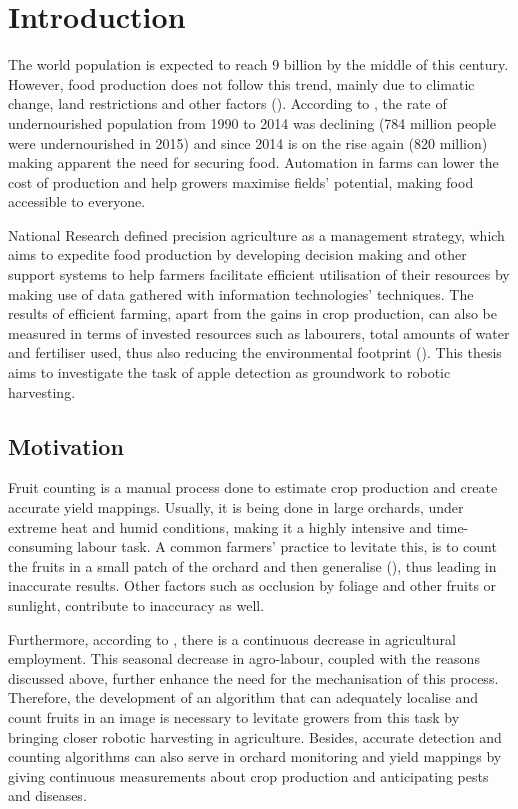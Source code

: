 \chapter{Introduction} \label{Chapter:Introduction}
The world population is expected to reach 9 billion by the middle of this century. However, food production does not follow this trend, mainly due to climatic change, land restrictions and other factors (\cite{godfray2010food}). According to \cite{mcguire2015fao}, the rate of undernourished population from 1990 to 2014 was declining (784 million people were undernourished in 2015) and since 2014 is on the rise again (820 million) making apparent the need for securing food. Automation in farms can lower the cost of production and help growers maximise fields' potential, making food accessible to everyone.

National Research \cite{NAP5491} defined precision agriculture as a management strategy, which aims to expedite food production by developing decision making and other support systems to help farmers facilitate efficient utilisation of their resources by making use of data gathered with information technologies' techniques. The results of efficient farming, apart from the gains in crop production, can also be measured in terms of invested resources such as labourers, total amounts of water and fertiliser used, thus also reducing the environmental footprint (\cite{zhang2012application}). This thesis aims to investigate the task of apple detection as groundwork to robotic harvesting.

\section{Motivation}
Fruit counting is a manual process done to estimate crop production and create accurate yield mappings. Usually, it is being done in large orchards, under extreme heat and humid conditions, making it a highly intensive and time-consuming labour task. A common farmers' practice to levitate this, is to count the fruits in a small patch of the orchard and then generalise (\cite{bargoti2017fruit}), thus leading in inaccurate results. Other factors such as occlusion by foliage and other fruits or sunlight, contribute to inaccuracy as well.

Furthermore, according to \cite{agro_employment}, there is a continuous decrease in agricultural employment. This seasonal decrease in agro-labour, coupled with the reasons discussed above, further enhance the need for the mechanisation of this process. Therefore, the development of an algorithm that can adequately localise and count fruits in an image is necessary to levitate growers from this task by bringing closer robotic harvesting in agriculture. Besides, accurate detection and counting algorithms can also serve in orchard monitoring and yield mappings by giving continuous measurements about crop production and anticipating pests and diseases.

